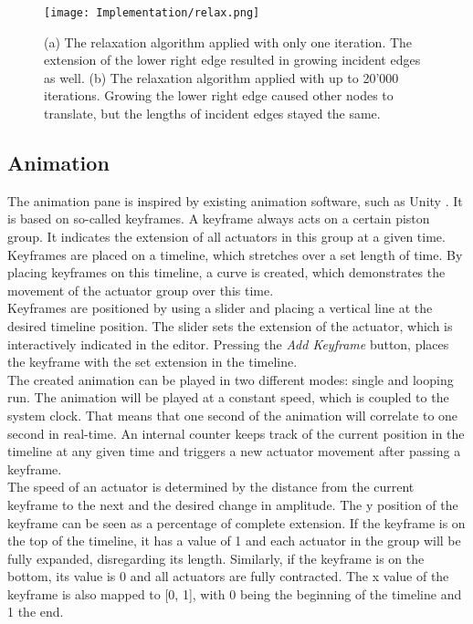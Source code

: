 \begin{figure}[ht!]
    \texttt{[image: Implementation/relax.png]}
    \centering
    \caption{(a) The relaxation algorithm applied with only one iteration. The extension of the lower right edge resulted in growing incident edges as well. (b) The relaxation algorithm applied with up to 20'000 iterations. Growing the lower right edge caused other nodes to translate, but the lengths of incident edges stayed the same.}
    \label{fig:relax}
\end{figure}

\subsection{Animation}
The animation pane is inspired by existing animation software, such as Unity \cite{unity}. It is based on so-called keyframes. A keyframe always acts on a certain piston group. It indicates the extension of all actuators in this group at a given time. Keyframes are placed on a timeline, which stretches over a set length of time. By placing keyframes on this timeline, a curve is created, which demonstrates the movement of the actuator group over this time.\\
Keyframes are positioned by using a slider and placing a vertical line at the desired timeline position. The slider sets the extension of the actuator, which is interactively indicated in the editor. Pressing the \textit{Add Keyframe} button, places the keyframe with the set extension in the timeline.\\
The created animation can be played in two different modes: single and looping run. The animation will be played at a constant speed, which is coupled to the system clock. That means that one second of the animation will correlate to one second in real-time. An internal counter keeps track of the current position in the timeline at any given time and triggers a new actuator movement after passing a keyframe.\\
The speed of an actuator is determined by the distance from the current keyframe to the next and the desired change in amplitude. The y position of the keyframe can be seen as a percentage of complete extension. If the keyframe is on the top of the timeline, it has a value of 1 and each actuator in the group will be fully expanded, disregarding its length. Similarly, if the keyframe is on the bottom, its value is 0 and all actuators are fully contracted. The x value of the keyframe is also mapped to [0, 1], with 0 being the beginning of the timeline and 1 the end.\\
